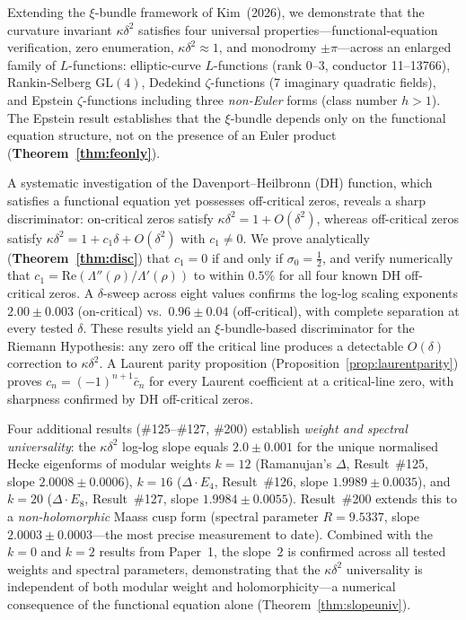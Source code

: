 \documentclass[11pt, a4paper]{article}
\theoremstyle{plain}
\theoremstyle{definition}
\begin{document}
\begin{tcolorbox}[
  colback=lightbg, colframe=zetaviolet!60!black,
  title={\bfseries Abstract}, fonttitle=\large,
  arc=3pt, boxrule=0.8pt, toptitle=3pt, bottomtitle=3pt
]
Extending the $\xi$-bundle framework of Kim~(2026), we demonstrate that
the curvature invariant $\kappa\delta^{2}$ satisfies four universal
properties---functional-equation verification, zero enumeration,
$\kappa\delta^{2}\approx 1$, and monodromy $\pm\pi$---across an enlarged
family of $L$-functions: elliptic-curve $L$-functions (rank 0--3,
conductor 11--13766), Rankin-Selberg $\mathrm{GL}(4)$, Dedekind
$\zeta$-functions (7 imaginary quadratic fields), and Epstein
$\zeta$-functions including three \emph{non-Euler} forms (class number
$h>1$).  The Epstein result establishes that the $\xi$-bundle depends
only on the functional equation structure, not on the presence of an
Euler product (\textbf{Theorem~\ref{thm:feonly}}).

A systematic investigation of the Davenport--Heilbronn (DH) function,
which satisfies a functional equation yet possesses off-critical zeros,
reveals a sharp discriminator: on-critical zeros satisfy $\kappa\delta^{2}
= 1 + O(\delta^{2})$, whereas off-critical zeros satisfy $\kappa\delta^{2}
= 1 + c_{1}\delta + O(\delta^{2})$ with $c_{1}\neq 0$.  We prove
analytically (\textbf{Theorem~\ref{thm:disc}}) that $c_{1} = 0$ if and only if
$\sigma_{0}=\tfrac{1}{2}$, and verify numerically that
$c_{1} = \mathrm{Re}(\Lambda''(\rho)/\Lambda'(\rho))$ to within $0.5\%$
for all four known DH off-critical zeros.  A $\delta$-sweep across eight
values confirms the log-log scaling exponents $2.00\pm0.003$
(on-critical) vs.\ $0.96\pm0.04$ (off-critical), with complete
separation at every tested $\delta$.  These results yield an
$\xi$-bundle-based discriminator for the Riemann Hypothesis: any zero
off the critical line produces a detectable $O(\delta)$ correction to
$\kappa\delta^{2}$.
A Laurent parity proposition (Proposition~\ref{prop:laurentparity})
proves $c_n=(-1)^{n+1}\bar{c}_n$ for every Laurent coefficient at a
critical-line zero, with sharpness confirmed by DH off-critical zeros.

\smallskip
\noindent Four additional results (\#125--\#127, \#200) establish
\emph{weight and spectral universality}: the $\kappa\delta^{2}$ log-log slope equals
$2.0\pm 0.001$ for the unique normalised Hecke eigenforms of modular
weights $k=12$ (Ramanujan's $\Delta$, Result~\#125,
slope $2.0008\pm 0.0006$), $k=16$
($\Delta\cdot E_4$, Result~\#126, slope $1.9989\pm 0.0035$),
and $k=20$ ($\Delta\cdot E_8$, Result~\#127, slope $1.9984\pm 0.0055$).
Result~\#200 extends this to a \emph{non-holomorphic} Maass cusp form
(spectral parameter $R=9.5337$, slope $2.0003\pm 0.0003$---the most
precise measurement to date).  Combined with the $k=0$ and $k=2$ results
from Paper~1, the slope~$2$ is confirmed across all tested weights and
spectral parameters, demonstrating that the $\kappa\delta^{2}$ universality
is independent of both modular weight and holomorphicity---a
numerical consequence of the functional equation alone (Theorem~\ref{thm:slopeuniv}).


\end{tcolorbox}
\end{document}
